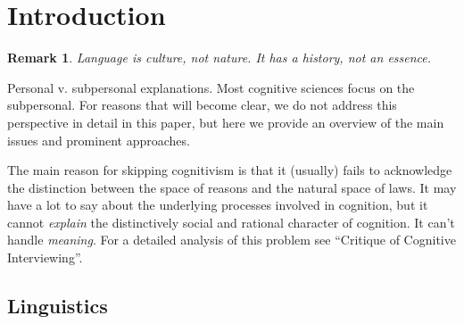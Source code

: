 \documentclass[11pt,twoside]{article}
\newtheorem{remark}{Remark}
\begin{document}
\newpage
\section{Introduction}

\begin{abstract}

\end{abstract}

\begin{remark}
  Language is culture, not nature.  It has a history, not an essence.
\end{remark}

Personal v. subpersonal explanations.  Most cognitive sciences focus
on the subpersonal.  For reasons that will become clear, we do not
address this perspective in detail in this paper, but here we provide
an overview of the main issues and prominent approaches.

The main reason for skipping cognitivism is that it (usually) fails to
acknowledge the distinction between the space of reasons and the
natural space of laws.  It may have a lot to say about the underlying
processes involved in cognition, but it cannot \textit{explain} the
distinctively social and rational character of cognition.  It can't
handle \textit{meaning}.  For a detailed analysis of this problem see
``Critique of Cognitive Interviewing''.

\subsection{Linguistics}
\end{document}
